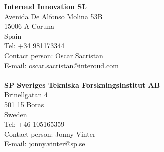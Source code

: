 \begin{footnotesize}
\begin{minipage}[t]{0.5\linewidth}
	\textbf{Interoud Innovation SL}\\
	Avenida De  Alfonso Molina 53B\\
	15006 A Coruna\\
	Spain\\
	Tel: +34 981173344\\
	Contact person: Oscar Sacristan\\
	E-mail: oscar.sacristan@interoud.com\\
	\\
	
	\textbf{SP Sveriges Tekniska Forskningsinstitut AB}\\
	Brinellgatan 4\\
	501 15 Boras\\
	Sweden\\
	Tel: +46 105165359\\
	Contact person: Jonny Vinter\\
	E-mail: jonny.vinter@sp.se\\
\end{minipage}
\end{footnotesize}

\clearpage
